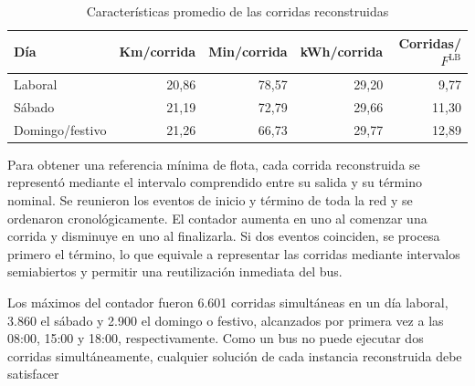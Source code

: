 \begin{table}[H]
\centering
\caption{Escala diaria reconstruida por tipo de día}
\label{tab:escala_demanda}
\small
{}
\end{table}

\begin{table}[H]
\centering
\caption{Características promedio de las corridas reconstruidas}
\label{tab:promedios_corridas}
\small
\begin{tabular}{lrrrr}
\toprule
\textbf{Día} & \textbf{Km/corrida} & \textbf{Min/corrida} &
\textbf{kWh/corrida} & \textbf{Corridas/$F^{\mathrm{LB}}$} \\
\midrule
Laboral & 20,86 & 78,57 & 29,20 & 9,77 \\
Sábado & 21,19 & 72,79 & 29,66 & 11,30 \\
Domingo/festivo & 21,26 & 66,73 & 29,77 & 12,89 \\
\bottomrule
\end{tabular}
\end{table}

Para obtener una referencia mínima de flota, cada corrida reconstruida se
representó mediante el intervalo comprendido entre su salida y su término
nominal. Se reunieron los eventos de inicio y término de toda la red y se
ordenaron cronológicamente. El contador aumenta en uno al comenzar una corrida y
disminuye en uno al finalizarla. Si dos eventos coinciden, se procesa primero el
término, lo que equivale a representar las corridas mediante intervalos
semiabiertos y permitir una reutilización inmediata del bus.

Los máximos del contador fueron 6.601 corridas simultáneas en un día laboral,
3.860 el sábado y 2.900 el domingo o festivo, alcanzados por primera vez a las
08:00, 15:00 y 18:00, respectivamente. Como un bus no puede ejecutar dos
corridas simultáneamente, cualquier solución de cada instancia reconstruida
debe satisfacer

